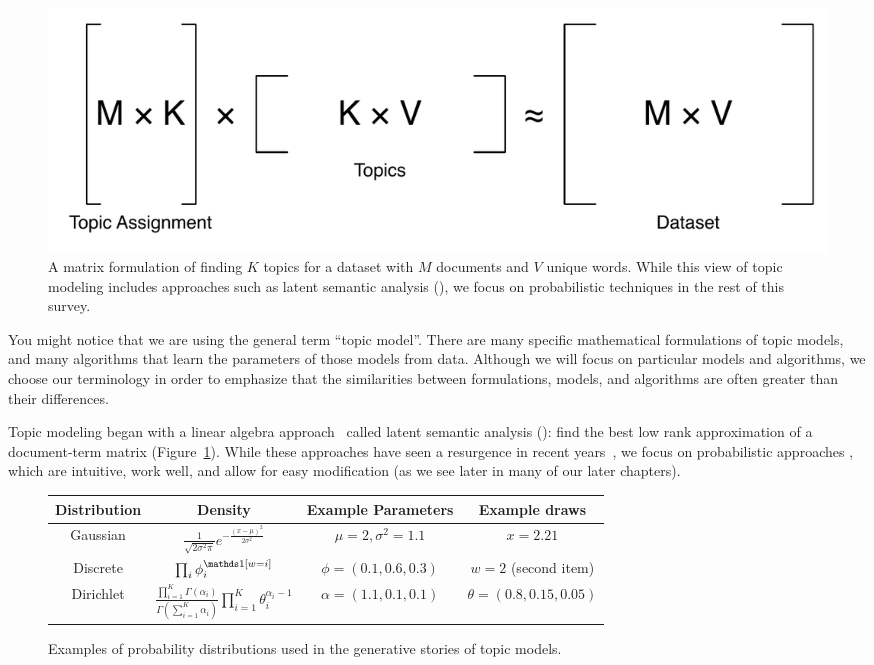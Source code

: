 \begin{center}
\begin{figure}
  \begin{center}
  \includegraphics[width=.8\linewidth]{figures/matrix_factorization}
  \end{center}

  \caption{A matrix formulation of finding $K$ topics for a dataset
    with $M$ documents and $V$ unique words.  While this
    view of topic modeling includes approaches such as latent semantic
    analysis (), we focus on probabilistic techniques in the
    rest of this survey.}
  \label{fig:matrix_topics}
\end{figure}
\end{center}

You might notice that we are using the general term ``topic model''.
There are many specific mathematical formulations of topic models, and many algorithms that learn the parameters of those models from data.
Although we will focus on particular models and algorithms, we choose our terminology in order to emphasize that the similarities between formulations, models, and algorithms are often greater than their differences.

Topic modeling began with a linear algebra approach~\citep{deerwester-90} called
latent semantic analysis (): find the best low rank approximation of a
document-term matrix (Figure~\ref{fig:matrix_topics}).  While these approaches
have seen a resurgence in recent years~\citep{anandkumar-12:lda,arora-13}, we
focus on probabilistic approaches \cite{hofmann-99,papadimitriou-00,blei-03}, which are intuitive, work well, and allow for
easy modification (as we see later in many of our later chapters).

\begin{figure}
\small
  \begin{tabular}{cccc}
    Distribution & Density & Example Parameters & Example draws \\
    \hline
    Gaussian  & $\frac{1}{\sqrt{2 \sigma^2 \pi}} e^{- \frac{(x-\mu)^2}{2 \sigma^2}}$ & $\mu=2, \sigma^2=1.1$ & $x=2.21$\\
    Discrete  & $\prod_i \phi_i^{\ind{w=i}}$ & $\phi=(0.1, 0.6, 0.3)$
                                                & $w=2$ (second
                                                  item) \\
   Dirichlet & $\frac{\prod_{i=1}^K \Gamma(\alpha_i)}{\Gamma \left( \sum_{i=1}^K \alpha_i \right)} \prod_{i=1}^K \theta_i^{\alpha_i - 1} $ & $\alpha = (1.1, 0.1, 0.1)$  & $\theta = (0.8, 0.15, 0.05)$ \\
     \hline
  \end{tabular}
  \caption{Examples of probability distributions used in the
    generative stories of topic models.}
  \label{fig:distribution_examples}
\end{figure}

